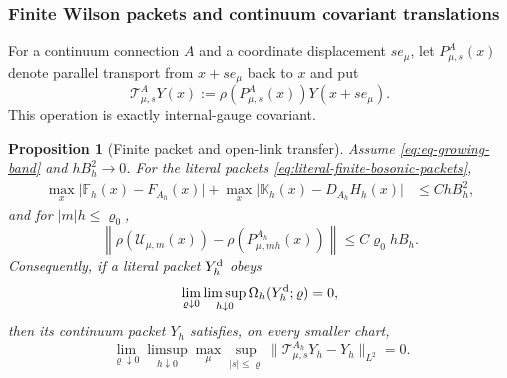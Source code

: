 \documentclass[11pt]{article}
\numberwithin{equation}{section}
\newtheorem{proposition}[proposition]{Proposition}
\theoremstyle{definition}
\theoremstyle{remark}
\newcommand{\norm}[1]{\lVert#1\rVert}
\newcommand{\abs}[1]{\lvert#1\rvert}
\begin{document}
\subsubsection{Finite Wilson packets and continuum covariant translations}

For a continuum connection $A$ and a coordinate displacement $s e_\mu$, let
$P^A_{\mu,s}(x)$ denote parallel transport from $x+s e_\mu$ back to $x$ and
put
\begin{equation}
 \mathscr T^A_{\mu,s}Y(x)
 :=\rho(P^A_{\mu,s}(x))Y(x+s e_\mu).
 \label{eq:continuum-covariant-translation}
\end{equation}
This operation is exactly internal-gauge covariant.

\begin{proposition}[Finite packet and open-link transfer]
\label{prop:Wilson-packet-transfer}
Assume \eqref{eq:eq-growing-band} and $hB_h^2\to0$.  For the literal
packets \eqref{eq:literal-finite-bosonic-packets},
\begin{align}
 \max_x\abs{\mathbb F_h(x)-F_{A_h}(x)}
 +\max_x\abs{\mathbb K_h(x)-D_{A_h}H_h(x)}
 &\le ChB_h^2,
 \label{eq:Wilson-packet-consistency}
\end{align}
and for $|m|h\le\varrho_0$,
\begin{equation}
 \left\|\rho(\mathcal U_{\mu,m}(x))
       -\rho(P^{A_h}_{\mu,mh}(x))\right\|
 \le C\varrho_0 hB_h.
 \label{eq:Wilson-transport-consistency}
\end{equation}
Consequently, if a literal packet $Y_h^{\rm d}$ obeys
\begin{equation}
 \lim_{\varrho\downarrow0}\limsup_{h\downarrow0}
 \Omega_h(Y_h^{\rm d};\varrho)=0,
 \label{eq:Wilson-finite-screen}
\end{equation}
then its continuum packet $Y_h$ satisfies, on every smaller chart,
\begin{equation}
 \lim_{\varrho\downarrow0}\limsup_{h\downarrow0}
 \max_\mu\sup_{|s|\le\varrho}
 \norm{\mathscr T^{A_h}_{\mu,s}Y_h-Y_h}_{L^2}=0.
 \label{eq:Wilson-continuum-screen}
\end{equation}
\end{proposition}
\end{document}
